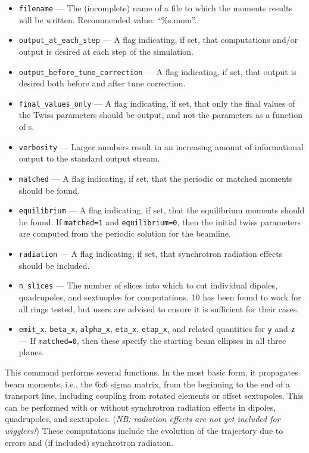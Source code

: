\documentclass[11pt]{article}
\begin{document}
\begin{itemize}
\item \verb|filename| --- The (incomplete) name of a file to which the moments results will be written.
  Recommended value: ``\%s.mom''.
\item \verb|output_at_each_step| --- A flag indicating, if set, that computations and/or output is desired at each step of the simulation.
\item \verb|output_before_tune_correction| --- A flag indicating, if set, that output is desired both before and after
tune correction.
\item \verb|final_values_only| --- A flag indicating, if set, that only the final values of the Twiss parameters should
be output, and not the parameters as a function of s.
\item \verb|verbosity| --- Larger numbers result in an increasing amount of informational output to the standard output stream.
\item \verb|matched| --- A flag indicating, if set, that the periodic or matched moments should be found.
\item \verb|equilibrium| --- A flag indicating, if set, that the equilibrium moments should be found.  If \verb|matched=1| and \verb|equilibrium=0|,
  then the initial twiss parameters are computed from the periodic solution for the beamline.
\item \verb|radiation| --- A flag indicating, if set, that synchrotron radiation effects should be included.
\item \verb|n_slices| --- The number of slices into which to cut individual dipoles, quadrupoles, and sextuoples for computations.
  10 has been found to work for all rings tested, but users are advised to ensure it is sufficient for their cases.
\item \verb|emit_x|, \verb|beta_x|, \verb|alpha_x|, \verb|eta_x|, \verb|etap_x|, and related quantities for \verb|y| and \verb|z| ---
  If \verb|matched=0|, then these specify the starting beam ellipses in all three planes.
\end{itemize}

This command performs several functions.  In the most basic form, it
propagates beam moments, i.e., the 6x6 sigma matrix, from the
beginning to the end of a transport line, including coupling from
rotated elements or offset sextupoles. This can be performed with or
without synchrotron radiation effects in dipoles, quadrupoles, and sextupoles.
({\em NB: radiation effects are not yet included for wigglers!})  These computations
include the evolution of the trajectory due to errors and (if included)
synchrotron radiation.
\end{document}
